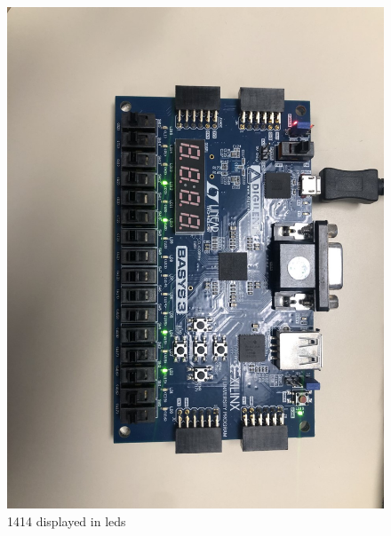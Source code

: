 \documentclass[11pt]{article}
\begin{document}
\begin{figure}[ht]\centering
	\includegraphics[width= \textwidth ]{bb2.png}
	\caption{1414 displayed in leds}
	\label{fig: bb2}
\end{figure}
\end{document}

